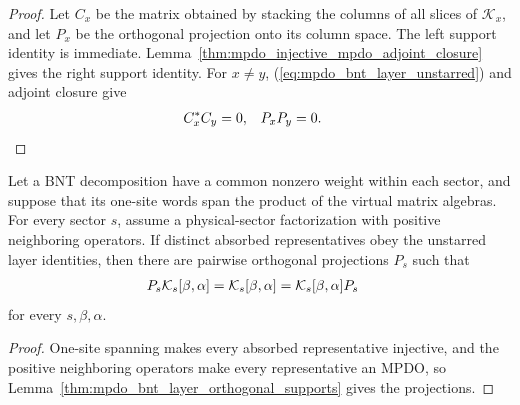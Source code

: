 \begin{proof}
    \leanok
    Let $C_x$ be the matrix obtained by stacking the columns of all slices of
    $\mathcal K_x$, and let $P_x$ be the orthogonal projection onto its column
    space. The left support identity is immediate.
    Lemma~\ref{thm:mpdo_injective_mpdo_adjoint_closure} gives the right
    support identity. For $x\ne y$, (\ref{eq:mpdo_bnt_layer_unstarred}) and
    adjoint closure give
    \begin{align}
        C_x^*C_y & =0,
                 & P_xP_y & =0.
        \notag
    \end{align}
\end{proof}

\begin{corollary}
    \label{cor:mpdo_common_weight_bnt_layer_supports}
    \leanok
    Let a BNT decomposition have a common nonzero weight within each sector,
    and suppose that its one-site words span the product of the virtual matrix
    algebras. For every sector $s$, assume a physical-sector factorization with
    positive neighboring operators. If distinct absorbed representatives obey
    the unstarred layer identities, then there are pairwise orthogonal
    projections $P_s$ such that
    \begin{align}
        P_s\mathcal K_s[\beta,\alpha]
         & =\mathcal K_s[\beta,\alpha]
        =\mathcal K_s[\beta,\alpha]P_s
        \notag
    \end{align}
    for every $s,\beta,\alpha$.
\end{corollary}

\begin{proof}
    \leanok
    One-site spanning makes every absorbed representative injective, and the
    positive neighboring operators make every representative an MPDO, so
    Lemma~\ref{thm:mpdo_bnt_layer_orthogonal_supports} gives the projections.
\end{proof}

